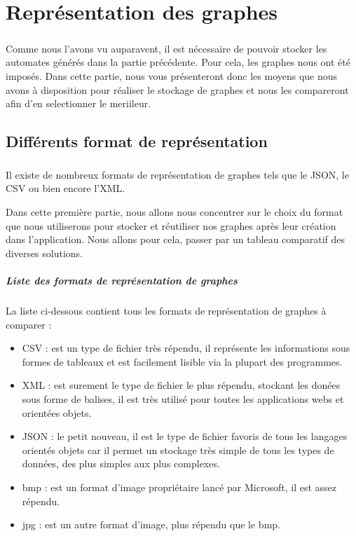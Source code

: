 \chapter{Représentation des graphes}
\paragraph{}

\cite{CoursGaborit2016}

Comme nous l'avons vu auparavent, il est nécessaire de pouvoir stocker les automates générés dans la partie précédente. Pour cela, les graphes nous ont été imposés. Dans cette partie, nous vous présenteront donc les moyens que nous avons à disposition pour réaliser le stockage de graphes et nous les compareront afin d'en selectionner le meriileur.

\section{Différents format de représentation}
  \paragraph{}
  Il existe de nombreux formats de représentation de graphes tels que le JSON, le CSV ou bien encore l'XML.
  
  Dans cette première partie, nous allons nous concentrer sur le choix du format que nous utiliserons pour stocker et réutiliser nos graphes après leur création dans l'application.
  Nous allons pour cela, passer par un tableau comparatif des diverses solutions.
  

  \paragraph{Liste des formats de représentation de graphes}
  La liste ci-dessous contient tous les formats de représentation de graphes à comparer : 
  \begin{itemize}
   \item CSV : est un type de fichier très répendu, il représente les informations sous formes de tableaux et est facilement lisible via la plupart des programmes. 
   \item XML : est surement le type de fichier le plus répendu, stockant les donées sous forme de balises, il est très utilisé pour toutes les applications webs et orientées objets. 
   \item JSON : le petit nouveau, il est le type de fichier favoris de tous les langages orientés objets car il permet un stockage très simple de tous les types de données, des plus simples aux plus complexes. 
   \item bmp : est un format d'image propriétaire lancé par Microsoft, il est assez répendu.
   \item jpg : est un autre format d'image, plus répendu que le bmp.
  \end{itemize}

